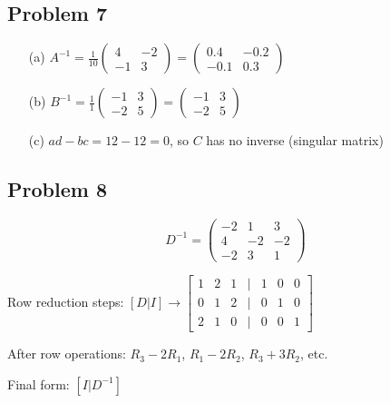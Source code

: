 \documentclass[11pt]{article}
\begin{document}
\subsection*{Problem 7}
\begin{enumerate}
\item[(a)] $A^{-1} = \frac{1}{10} \begin{pmatrix} 4 & -2 \\ -1 & 3 \end{pmatrix} = \begin{pmatrix} 0.4 & -0.2 \\ -0.1 & 0.3 \end{pmatrix}$
\item[(b)] $B^{-1} = \frac{1}{1} \begin{pmatrix} -1 & 3 \\ -2 & 5 \end{pmatrix} = \begin{pmatrix} -1 & 3 \\ -2 & 5 \end{pmatrix}$
\item[(c)] $ad - bc = 12 - 12 = 0$, so $C$ has no inverse (singular matrix)
\end{enumerate}

\subsection*{Problem 8}
$$D^{-1} = \begin{pmatrix} -2 & 1 & 3 \\ 4 & -2 & -2 \\ -2 & 3 & 1 \end{pmatrix}$$

Row reduction steps:
$[D|I] \rightarrow \begin{bmatrix} 1 & 2 & 1 & | & 1 & 0 & 0 \\ 0 & 1 & 2 & | & 0 & 1 & 0 \\ 2 & 1 & 0 & | & 0 & 0 & 1 \end{bmatrix}$

After row operations: $R_3 - 2R_1$, $R_1 - 2R_2$, $R_3 + 3R_2$, etc.

Final form: $[I|D^{-1}]$
\end{document}
